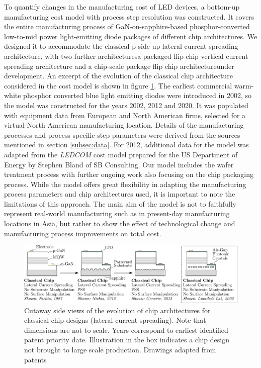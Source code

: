 \documentclass[a4paper,nocompress]{spie}  %
\begin{document}
        To quantify changes in the manufacturing cost of LED devices, a bottom-up manufacturing cost model with process step resolution was constructed. It covers the entire manufacturing process of GaN-on-sapphire-based phosphor-converted low-to-mid power light-emitting diode packages of different chip architectures. We designed it to accommodate the classical p-side-up lateral current spreading architecture, with two further architectures\textemdash a packaged flip-chip vertical current spreading architecture and a chip-scale package flip chip architecture\textemdash under development. An excerpt of the evolution of the classical chip architecture considered in the cost model is shown in figure \ref{fig:chip_arch}. The earliest commercial warm-white phosphor converted blue light emitting diodes were introduced in 2002, so the model was constructed for the years 2002, 2012 and 2020. It was populated with equipment data from European and North American firms, selected for a virtual North American manufacturing location. Details of the manufacturing processes and process-specific step parameters were derived from the sources mentioned in section \ref{subsec:data}. For 2012, additional data for the model was adapted from the \textit{LEDCOM} cost model prepared for the US Department of Energy by Stephen Bland of SB Consulting\cite{ledcomv2}. Our model includes the wafer treatment process with further ongoing work also focusing on the chip packaging process. While the model offers great flexibility in adapting the manufacturing process parameters and chip architectures used, it is important to note the limitations of this approach. The main aim of the model is not to faithfully represent real-world manufacturing such as in present-day manufacturing locations in Asia, but rather to show the effect of technological change and manufacturing process improvements on total cost. 

        \begin{figure} [ht]
            \begin{center}
                \includegraphics[width=\textwidth]{SPIE/article/chip_architectures.pdf}
            \end{center}
            \caption{Cutaway side views of the evolution of chip architectures for classical chip designs (lateral current spreading). Note that dimensions are not to scale. Years correspond to earliest identified patent priority date. Illustration in the box indicates a chip design not brought to large scale production. Drawings adapted from patents \cite{nagahama2013nitride,tanaka2010semiconductor,wierer2006photonic}}
            \label{fig:chip_arch}
        \end{figure}
\end{document}
